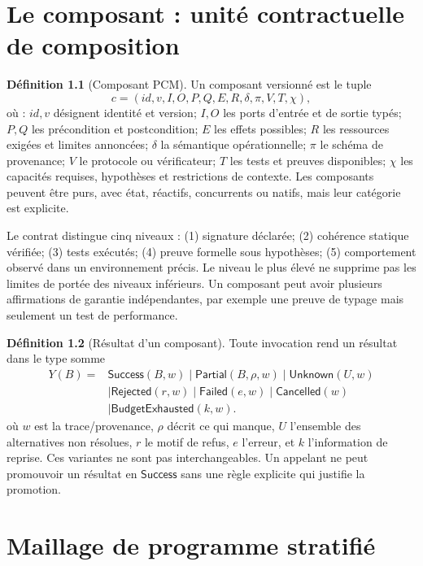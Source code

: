 \documentclass[11pt,a4paper,openany]{book}
\theoremstyle{definition}
\newtheorem{definition}{Définition}[chapter]
\theoremstyle{plain}
\theoremstyle{remark}
\begin{document}
\chapter{Le composant : unité contractuelle de composition}
\begin{definition}[Composant PCM]
Un composant versionné est le tuple
\[
c=(id,v,I,O,P,Q,E,R,\delta,\pi,V,T,\chi),
\]
où : $id,v$ désignent identité et version; $I,O$ les ports d'entrée et de sortie typés; $P,Q$ les précondition et postcondition; $E$ les effets possibles; $R$ les ressources exigées et limites annoncées; $\delta$ la sémantique opérationnelle; $\pi$ le schéma de provenance; $V$ le protocole ou vérificateur; $T$ les tests et preuves disponibles; $\chi$ les capacités requises, hypothèses et restrictions de contexte. Les composants peuvent être purs, avec état, réactifs, concurrents ou natifs, mais leur catégorie est explicite.
\end{definition}

Le contrat distingue cinq niveaux : (1) signature déclarée; (2) cohérence statique vérifiée; (3) tests exécutés; (4) preuve formelle sous hypothèses; (5) comportement observé dans un environnement précis. Le niveau le plus élevé ne supprime pas les limites de portée des niveaux inférieurs. Un composant peut avoir plusieurs affirmations de garantie indépendantes, par exemple une preuve de typage mais seulement un test de performance.

\begin{definition}[Résultat d'un composant]
Toute invocation rend un résultat dans le type somme
\[\begin{aligned}
Y(B)={}&\mathsf{Success}(B,w)\mid\mathsf{Partial}(B,\rho,w)\mid\mathsf{Unknown}(U,w)\\
&\mid\mathsf{Rejected}(r,w)\mid\mathsf{Failed}(e,w)\mid\mathsf{Cancelled}(w)\\
&\mid\mathsf{BudgetExhausted}(k,w).
\end{aligned}\]
où $w$ est la trace/provenance, $\rho$ décrit ce qui manque, $U$ l'ensemble des alternatives non résolues, $r$ le motif de refus, $e$ l'erreur, et $k$ l'information de reprise. Ces variantes ne sont pas interchangeables. Un appelant ne peut promouvoir un résultat en $\mathsf{Success}$ sans une règle explicite qui justifie la promotion.
\end{definition}

\chapter{Maillage de programme stratifié}
\end{document}
